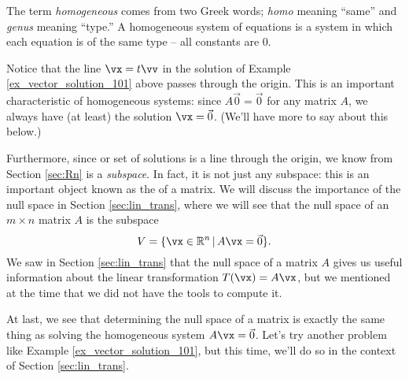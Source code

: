 \smallskip

The term \textit{homogeneous} comes from two Greek words; \textit{homo} meaning ``same'' and \textit{genus} meaning ``type.'' A homogeneous system of equations is a system in which each equation is of the same type -- all constants are 0. 

Notice that the line $\vx =t\vv$ in the solution of Example \ref{ex_vector_solution_101} above passes through the origin. This is an important characteristic of homogeneous systems: since $A\vec 0 = \vec 0$ for any matrix $A$, we always have (at least) the solution $\vx = \vec 0$. (We'll have more to say about this below.)

Furthermore, since or set of solutions is a line through the origin, we know from Section \ref{sec:Rn} is a \textit{subspace}. In fact, it is not just any subspace: this is an important object known as the  of a matrix. We will discuss the importance of the null space in Section \ref{sec:lin_trans}, where we will see that the null space of an $m\times n$ matrix $A$ is the subspace
\[
V = \{\vx\in\R^n \, | \, A\vx = \vec 0\}.
\]
We saw in Section \ref{sec:lin_trans} that the null space of a matrix $A$ gives us useful information about the linear transformation $T(\vx) = A\vx$, but we mentioned at the time that we did not have the tools to compute it.

At last, we see that determining the null space of a matrix is exactly the same thing as solving the homogeneous system $A\vx = \vec 0$. Let's try another problem like Example \ref{ex_vector_solution_101}, but this time, we'll do so in the context of Section \ref{sec:lin_trans}.

\medskip

